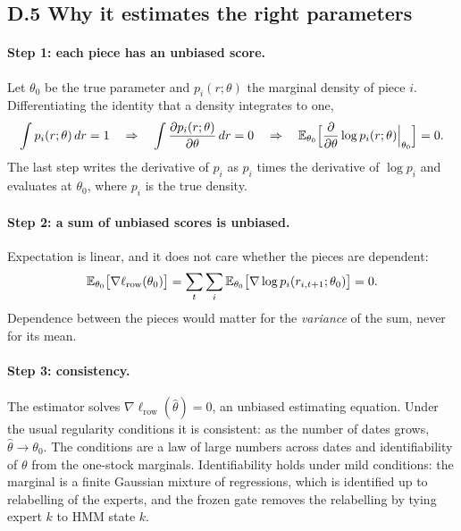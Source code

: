 \subsection*{D.5 Why it estimates the right parameters}

\paragraph{Step 1: each piece has an unbiased score.} Let $\theta_0$ be the true parameter and $p_i(r;\theta)$ the marginal density of piece $i$. Differentiating the identity that a density integrates to one,
\begin{equation*}
\int p_i(r;\theta)\,dr=1\quad\Rightarrow\quad\int\frac{\partial p_i(r;\theta)}{\partial\theta}\,dr=0\quad\Rightarrow\quad\mathbb{E}_{\theta_0}\Big[\frac{\partial}{\partial\theta}\log p_i(r;\theta)\Big|_{\theta_0}\Big]=0.
\end{equation*}
The last step writes the derivative of $p_i$ as $p_i$ times the derivative of $\log p_i$ and evaluates at $\theta_0$, where $p_i$ is the true density.

\paragraph{Step 2: a sum of unbiased scores is unbiased.} Expectation is linear, and it does not care whether the pieces are dependent:
\begin{equation*}
\mathbb{E}_{\theta_0}\big[\nabla\ell_{\text{row}}(\theta_0)\big]=\sum_t\sum_i\mathbb{E}_{\theta_0}\big[\nabla\log p_i(r_{i,t+1};\theta_0)\big]=0.
\end{equation*}
Dependence between the pieces would matter for the \emph{variance} of the sum, never for its mean.

\paragraph{Step 3: consistency.} The estimator solves $\nabla\ell_{\text{row}}(\hat\theta)=0$, an unbiased estimating equation. Under the usual regularity conditions it is consistent: as the number of dates grows, $\hat\theta\to\theta_0$. The conditions are a law of large numbers across dates and identifiability of $\theta$ from the one-stock marginals. Identifiability holds under mild conditions: the marginal is a finite Gaussian mixture of regressions, which is identified up to relabelling of the experts, and the frozen gate removes the relabelling by tying expert $k$ to HMM state $k$.


